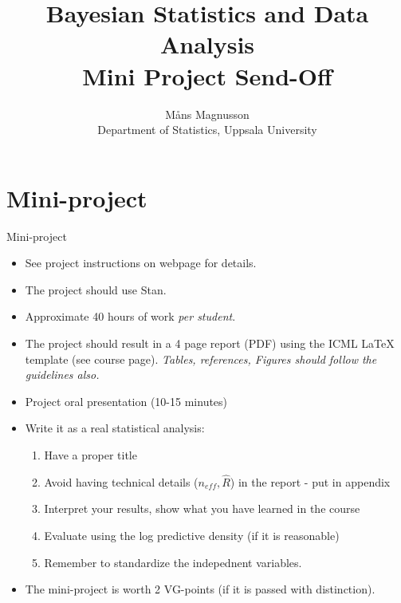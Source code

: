\documentclass[10pt]{beamer}
\title[]{{\color{black}Bayesian Statistics and Data Analysis \\ Mini Project Send-Off}}
\author[]{M{\aa}ns Magnusson \\ Department of Statistics, Uppsala University}
\date{}
\begin{document}
\frame{\titlepage
}



\section{Mini-project}
\frame{\sectionpage}

\begin{frame}{Mini-project}

\begin{itemize}
\item See project instructions on webpage for details.
\pause
\item The project should use Stan.
\item Approximate 40 hours of work \emph{per student}.\pause
\item The project should result in a 4 page report (PDF) using the ICML LaTeX template (see course page). \emph{Tables, references, Figures should follow the guidelines also.}\pause
\item Project oral presentation (10-15 minutes) \pause
\item Write it as a real statistical analysis:
\begin{enumerate}
\item Have a proper title\pause
\item Avoid having technical details ($n_{eff},\hat{R}$) in the report - put in appendix\pause
\item Interpret your results, show what you have learned in the course\pause
\item Evaluate using the log predictive density (if it is reasonable)
\item Remember to standardize the indepednent variables.
\end{enumerate}
\item The mini-project is worth 2 VG-points (if it is passed with distinction).
\end{itemize}
\end{frame}



\end{document}
